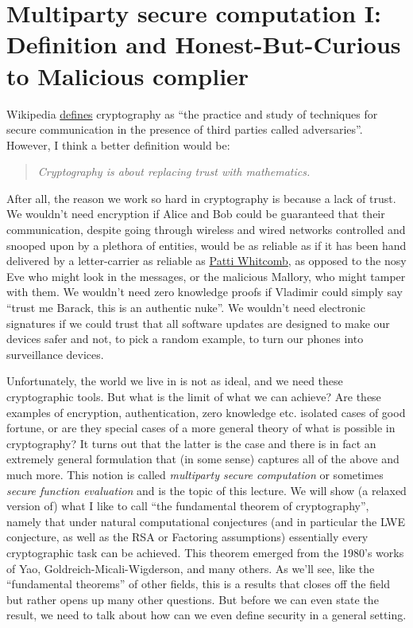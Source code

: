 \chapter{Multiparty secure computation I: Definition and
Honest-But-Curious to Malicious
complier}\label{Multiparty-secure-computa}

Wikipedia \href{https://en.wikipedia.org/wiki/Cryptography}{defines}
cryptography as ``the practice and study of techniques for secure
communication in the presence of third parties called adversaries''.
However, I think a better definition would be:

\begin{quote}
\emph{Cryptography is about replacing trust with mathematics.}
\end{quote}

After all, the reason we work so hard in cryptography is because a lack
of trust. We wouldn't need encryption if Alice and Bob could be
guaranteed that their communication, despite going through wireless and
wired networks controlled and snooped upon by a plethora of entities,
would be as reliable as if it has been hand delivered by a
letter-carrier as reliable as
\href{http://old.iolaregister.com/Local\%20News/Stories/Weatherwontstopcarriers.html}{Patti
Whitcomb}, as opposed to the nosy Eve who might look in the messages, or
the malicious Mallory, who might tamper with them. We wouldn't need zero
knowledge proofs if Vladimir could simply say ``trust me Barack, this is
an authentic nuke''. We wouldn't need electronic signatures if we could
trust that all software updates are designed to make our devices safer
and not, to pick a random example, to turn our phones into surveillance
devices.

Unfortunately, the world we live in is not as ideal, and we need these
cryptographic tools. But what is the limit of what we can achieve? Are
these examples of encryption, authentication, zero knowledge etc.
isolated cases of good fortune, or are they special cases of a more
general theory of what is possible in cryptography? It turns out that
the latter is the case and there is in fact an extremely general
formulation that (in some sense) captures all of the above and much
more. This notion is called \emph{multiparty secure computation} or
sometimes \emph{secure function evaluation} and is the topic of this
lecture. We will show (a relaxed version of) what I like to call ``the
fundamental theorem of cryptography'', namely that under natural
computational conjectures (and in particular the LWE conjecture, as well
as the RSA or Factoring assumptions) essentially every cryptographic
task can be achieved. This theorem emerged from the 1980's works of Yao,
Goldreich-Micali-Wigderson, and many others. As we'll see, like the
``fundamental theorems'' of other fields, this is a results that closes
off the field but rather opens up many other questions. But before we
can even state the result, we need to talk about how can we even define
security in a general setting.

